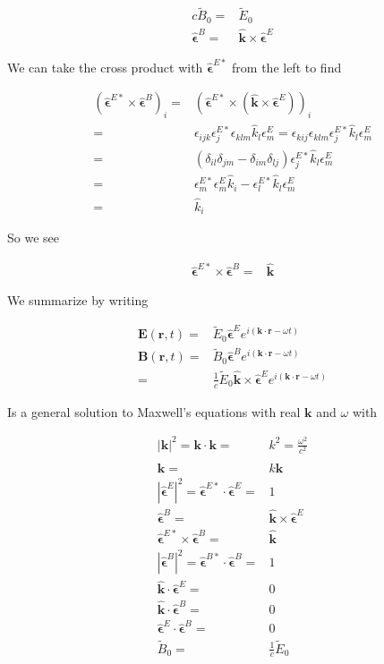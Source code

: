 \documentclass[12pt]{article}
\newcommand{\ep}{\epsilon}
\renewcommand{\vec}[1]{\boldsymbol{#1}}
\newcommand{\unitvec}[1]{\hat{\boldsymbol{#1}}}
\begin{document}
\begin{align}
c\tilde{B}_0 =& \tilde{E}_0\\
\unitvec{\ep}^B =& \unitvec{k}\times \unitvec{\ep}^E
\end{align}

We can take the cross product with $\unitvec{\ep}^{E*}$ from the left to find

\begin{align}
\left(\unitvec{\ep}^{E*} \times \unitvec{\ep}^B\right)_i =& \left(\unitvec{\ep}^{E*}\times\left(\unitvec{k}\times\unitvec{\ep}^E\right)\right)_i\\
=&\ep_{ijk} \ep^{E*}_j \ep_{klm} \hat{k}_l\ep^E_{m} = \ep_{kij}\ep_{klm}\ep^{E*}_j\hat{k}_l\ep^E_m\\
=& (\delta_{il}\delta_{jm} - \delta_{im}\delta_{lj})\ep^{E*}_j\hat{k}_l\ep^E_m\\
=& \ep_m^{E*}\ep_m^E \hat{k}_i - \ep^{E*}_l \hat{k}_l \ep^E_m\\
=& \hat{k}_i
\end{align}

So we see

\begin{align}
\unitvec{\ep}^{E*}\times\unitvec{\ep}^B =& \unitvec{k}
\end{align}

We summarize by writing

\begin{align}
\vec{E}(\vec{r},t) =& \tilde{E}_0 \unitvec{\ep}^E e^{i(\vec{k}\cdot\vec{r}-\omega t)}\\
\vec{B}(\vec{r},t) =& \tilde{B}_0 \unitvec{\ep}^B e^{i(\vec{k}\cdot\vec{r}-\omega t)}\\
=& \frac{1}{c}\tilde{E}_0 \unitvec{k}\times \unitvec{\ep}^E e^{i(\vec{k}\cdot\vec{r}-\omega t)}
\end{align}

Is a general solution to Maxwell's equations with real $\vec{k}$ and $\omega$ with

\begin{align}
\left|\vec{k}\right|^2 = \vec{k}\cdot\vec{k} =& k^2 = \frac{\omega^2}{c^2}\\
\vec{k} =& k\unitvec{k}\\
\left|\unitvec{\ep}^E\right|^2 = \unitvec{\ep}^{E*}\cdot\unitvec{\ep}^E =& 1\\
\unitvec{\ep}^B =& \unitvec{k}\times \unitvec{\ep}^E\\
\unitvec{\ep}^{E*}\times\unitvec{\ep}^B =& \unitvec{k}\\
\left|\unitvec{\ep}^B\right|^2 =\unitvec{\ep}^{B*}\cdot\unitvec{\ep}^B =& 1\\
\unitvec{k}\cdot\unitvec{\ep}^E =& 0\\
\unitvec{k}\cdot\unitvec{\ep}^B =& 0\\
\unitvec{\ep}^E\cdot\unitvec{\ep}^B =& 0\\
\tilde{B}_0 =& \frac{1}{c}\tilde{E}_0
\end{align}
\end{document}
